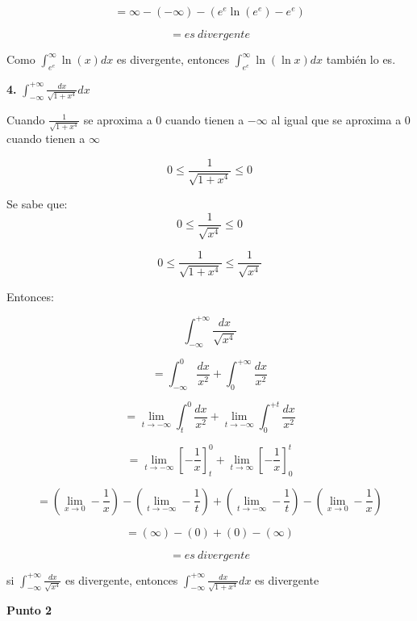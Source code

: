 \documentclass[12pt]{article}
\begin{document}
\begin{flushleft}
$$ = \infty - \left( - \infty \right)  - \left( e^e \ln(e^e) - e^e
 \right) $$

$$= es~divergente$$

Como $\int_{e^{e}}^{\infty }\ln\left ( x \right )dx$ es divergente, entonces $\int_{e^{e}}^{\infty }\ln\left ( \ln x \right )dx$ también lo es.

\newpage


\textbf{4.} \Large $\int_{-\infty}^{+\infty }\frac{dx}{\sqrt{1+x^{4}}}dx$\\

\vspace{0.3cm}
\normalsize

Cuando $\frac{1}{\sqrt{1+x^{4}}}$ se aproxima a 0 cuando tienen a $-\infty$ al igual que se aproxima a 0 cuando tienen a $\infty$

$$0 \leq \frac{1}{\sqrt{1+x^{4}}} \leq 0 $$

Se sabe que:
\\
$$0 \leq \frac{1}{\sqrt{x^{4}}} \leq 0 $$


$$0 \leq \frac{1}{\sqrt{1+ x^{4}}} \leq \frac{1}{\sqrt{x^{4}}} $$

Entonces:

$$  \int_{-\infty}^{+\infty }\frac{dx}{\sqrt{x^{4}}}$$
     
$$ = \int_{-\infty}^{0}\frac{dx}{x^{2}} + \int_{0}^{+\infty }\frac{dx}{x^{2}}$$

$$= \lim_{t \to -\infty } \int_{t}^{0}\frac{dx}{x^{2}} + \lim_{t \to -\infty } \int_{0}^{+t}\frac{dx}{x^{2}}$$

$$= \lim_{t \to -\infty } \left[-\frac{1}{x} \right]_t^0 + \lim_{t \to \infty } \left[-\frac{1}{x}\right]_0^t$$

$$=\left(\lim_{x \to 0 } - \frac{1}{x}\right) - \left(\lim_{t \to -\infty} - \frac{1}{t}\right) +  \left(\lim_{t \to -\infty} - \frac{1}{t}\right) - \left(\lim_{x \to 0 } - \frac{1}{x}\right)$$

$$=(\infty) - (0) +  (0) - (\infty)$$
 



$$= es~divergente$$

si \Large $\int_{-\infty}^{+\infty }\frac{dx}{\sqrt{x^{4}}}$  \normalsize es divergente, entonces \Large $\int_{-\infty}^{+\infty }\frac{dx}{\sqrt{1+x^{4}}}dx$ \normalsize  es divergente


\newpage 

\normalsize

\textbf{Punto 2}\\


\end{flushleft}
\end{document}
